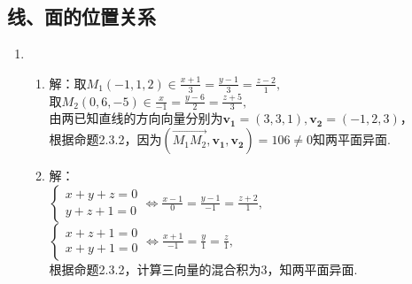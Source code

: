 \documentclass[UTF8]{ctexart}
\begin{document}
\subsection{线、面的位置关系}
\begin{enumerate}
\item \begin{enumerate}[(1)]
\item 解：取$M_1\left(-1,1,2\right)\in\displaystyle\frac{x+1}{3}=\displaystyle\frac{y-1}{3}=\displaystyle\frac{z-2}{1},$\\
取$M_2\left(0,6,-5\right)\in\displaystyle\frac{x}{-1}=\displaystyle\frac{y-6}{2}=\displaystyle\frac{z+5}{3},$\\
由两已知直线的方向向量分别为$\mathbf{v_1}=\left(3,3,1\right),\mathbf{v_2}=\left(-1,2,3\right)$，\\根据命题2.3.2，因为$\left(\overrightarrow{M_1M_2},\mathbf{v_1},\mathbf{v_2}\right)=106\neq0$知两平面异面.

\item 解：\\$\left\{\begin{array}{l}x+y+z=0\\y+z+1=0\end{array}\right.\Leftrightarrow\displaystyle\frac{x-1}{0}=\displaystyle\frac{y-1}{-1}=\displaystyle\frac{z+2}{1},$\\
$\left\{\begin{array}{l}x+z+1=0\\x+y+1=0\end{array}\right.\Leftrightarrow\displaystyle\frac{x+1}{-1}=\displaystyle\frac{y}{1}=\displaystyle\frac{z}{1},$\\
根据命题2.3.2，计算三向量的混合积为$3$，知两平面异面. 
\end{enumerate}


\end{enumerate}
\end{document}
